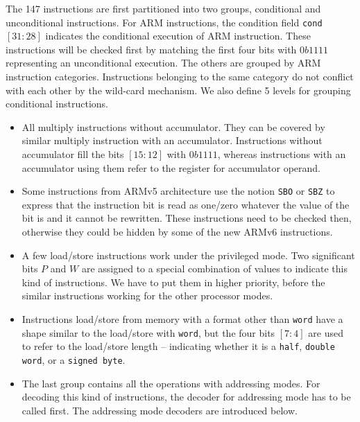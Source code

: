 The 147 instructions are first partitioned into two groups, conditional and
unconditional instructions.
For ARM instructions, the condition field \texttt{cond} $[31:28]$ indicates
the conditional execution of ARM instruction.
These instructions will be checked first by matching the first four bits with
$0b1111$ representing an unconditional execution.
The others are grouped by ARM instruction categories.
Instructions belonging to the same category do not conflict with each other
by the wild-card mechanism.
We also define 5 levels for grouping conditional instructions.
\begin{itemize}
\item
All multiply instructions without accumulator. They can be covered by
similar multiply instruction with an accumulator. Instructions without
accumulator fill the bits $[15:12]$ with $0b1111$, whereas instructions with
an accumulator using them refer to the register for accumulator operand.
\item
Some instructions from ARMv5 architecture use the notion \texttt{SBO} or
\texttt{SBZ} to express that the instruction bit is read as one/zero whatever the
value of the bit is and it cannot be rewritten.
These instructions need to be checked then, otherwise they could be hidden by
some of the new ARMv6 instructions.
\item
A few load/store instructions work under the privileged mode.  %
Two significant bits $P$ and $W$ are assigned to a special combination of values
to indicate this kind of instructions.
We have to put them in higher priority, before
the similar instructions working for the other processor modes.
\item
Instructions load/store from memory with a format other than \texttt{word}
have a shape similar to the load/store with \texttt{word},
but the four bits $[7:4]$ are used to refer to the load/store length --
indicating
whether it is a \texttt{half}, \texttt{double word}, or a \texttt{signed byte}.
\item
The last group contains all the operations with addressing modes.
For decoding this kind of instructions,
the decoder for addressing mode has to be called first.
The addressing mode decoders are introduced below.
\end{itemize}


